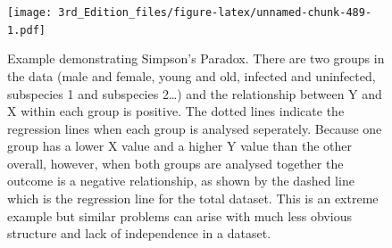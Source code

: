 \documentclass[
]{book}
\begin{document}
\begin{figure}
\centering
\texttt{[image: 3rd\_Edition\_files/figure-latex/unnamed-chunk-489-1.pdf]}
\caption{\label{fig:unnamed-chunk-489}Example demonstrating Simpson's Paradox. There are two groups in the data (male and female, young and old, infected and uninfected, subspecies 1 and subspecies 2\ldots) and the relationship between Y and X within each group is positive. The dotted lines indicate the regression lines when each group is analysed seperately. Because one group has a lower X value and a higher Y value than the other overall, however, when both groups are analysed together the outcome is a negative relationship, as shown by the dashed line which is the regression line for the total dataset. This is an extreme example but similar problems can arise with much less obvious structure and lack of independence in a dataset.}
\end{figure}
\end{document}
